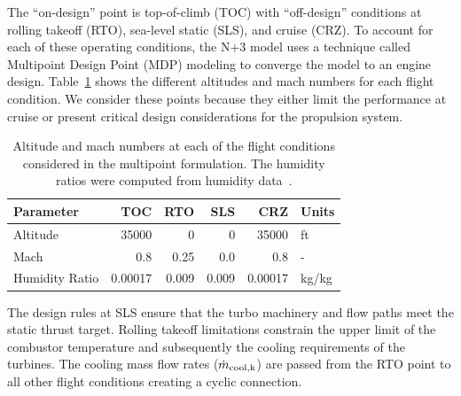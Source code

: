 \documentclass[conf]{new-aiaa}
\begin{document}
The ``on-design'' point is top-of-climb (TOC) with ``off-design'' conditions at rolling takeoff (RTO), sea-level static (SLS), and cruise (CRZ).
To account for each of these operating conditions, the N+3 model uses a technique called Multipoint Design Point (MDP) modeling to converge the model to an engine design.
Table~\ref{tab:flight_conds} shows the different altitudes and mach numbers for each flight condition.
We consider these points because they either limit the performance at cruise or present critical design considerations for the propulsion system.
\begin{table}[hbt!]
    \centering
    \caption{Altitude and mach numbers at each of the flight conditions considered in the multipoint formulation.
        The humidity ratios were computed from humidity data~\cite{Kalnay1996}.
    }
    \begin{tabular}{l r r r r l}
        \hline
        Parameter      & TOC     & RTO   & SLS   & CRZ     & Units      \\
        \hline
        Altitude       & 35000   & 0     & 0     & 35000   & \si{ft}    \\
        Mach           & 0.8     & 0.25  & 0.0   & 0.8     & -          \\
        Humidity Ratio & 0.00017 & 0.009 & 0.009 & 0.00017 & \si{kg/kg} \\
        \hline
    \end{tabular}
    \label{tab:flight_conds}
\end{table}
The design rules at SLS ensure that the turbo machinery and flow paths meet the static thrust target.
Rolling takeoff limitations constrain the upper limit of the combustor temperature and subsequently the cooling requirements of the turbines.
The cooling mass flow rates ($\dot{m}_{\rm{cool},k}$) are passed from the RTO point to all other flight conditions creating a cyclic connection.
\end{document}
